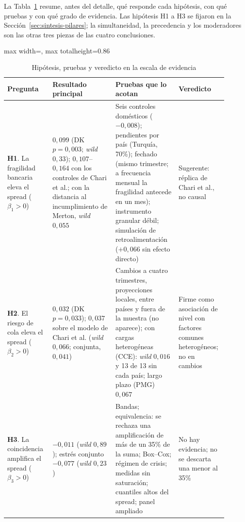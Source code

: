 La Tabla~\ref{tab:veredictos} resume, antes del detalle, qué responde cada hipótesis, con qué pruebas y con qué grado de evidencia. Las hipótesis H1 a H3 se fijaron en la Sección~\ref{sec:sintesis-pilares}; la simultaneidad, la precedencia y los moderadores son las otras tres piezas de las cuatro conclusiones.

\begin{table}[p]
\centering
\scriptsize
\caption[Hipótesis, pruebas y veredicto]{Hipótesis, pruebas y veredicto en la escala de evidencia}
\label{tab:veredictos}
\begin{adjustbox}{max width=\linewidth, max totalheight=0.86\textheight}
\begin{tabular}{>{\raggedright\arraybackslash}p{0.19\linewidth}>{\raggedright\arraybackslash}p{0.27\linewidth}>{\raggedright\arraybackslash}p{0.27\linewidth}>{\raggedright\arraybackslash}p{0.17\linewidth}}
\toprule
Pregunta & Resultado principal & Pruebas que lo acotan & Veredicto \\
\midrule
\textbf{H1}. La fragilidad bancaria eleva el spread ($\beta_1>0$) & $0{,}099$ (DK $p=0{,}003$; \textit{wild} $0{,}33$); $0{,}107$--$0{,}164$ con los controles de Chari et al.; con la distancia al incumplimiento de Merton, \textit{wild} $0{,}055$ & Seis controles domésticos ($-0{,}008$); pendientes por país (Turquía, 70\%); fechado (mismo trimestre; a frecuencia mensual la fragilidad antecede en un mes); instrumento granular débil; simulación de retroalimentación ($+0{,}066$ sin efecto directo) & Sugerente: réplica de Chari et al., no causal \\
\addlinespace
\textbf{H2}. El riesgo de cola eleva el spread ($\beta_2>0$) & $0{,}032$ (DK $p=0{,}033$); $0{,}037$ sobre el modelo de Chari et al. (\textit{wild} $0{,}066$; conjunta, $0{,}041$) & Cambios a cuatro trimestres, proyecciones locales, entre países y fuera de la muestra (no aparece); con cargas heterogéneas (CCE): \textit{wild} $0{,}016$ y 13 de 13 sin cada país; largo plazo (PMG) $0{,}067$ & Firme como asociación de nivel con factores comunes heterogéneos; no en cambios \\
\addlinespace
\textbf{H3}. La coincidencia amplifica el spread ($\beta_3>0$) & $-0{,}011$ (\textit{wild} $0{,}89$); estrés conjunto $-0{,}077$ (\textit{wild} $0{,}23$) & Bandas; equivalencia: se rechaza una amplificación de más de un 35\% de la suma; Box--Cox; régimen de crisis; medidas sin saturación; cuantiles altos del spread; panel ampliado & No hay evidencia; no se descarta una menor al 35\% \\

\end{tabular}
\end{adjustbox}
\end{table}
